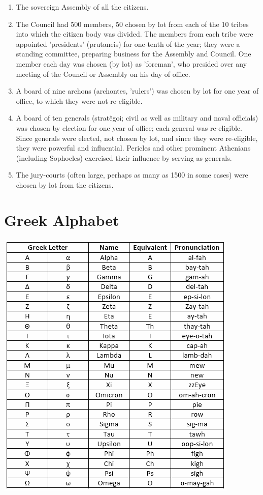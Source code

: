 \documentclass[oneside]{article}
\begin{document}
\begin{enumerate}
\item The sovereign Assembly of all the citizens. 
\item The Council had 500 members, 50 chosen by lot from each of the 10 tribes into which the citizen body was divided. The members from each tribe were appointed 'presidents' (prutaneis) for one-tenth of the year; they were a standing committee, preparing business for the Assembly and Council. One member each day was chosen (by lot) as 'foreman', who presided over any meeting of the Council or Assembly on his day of office.  
\item A board of nine archons (archontes, 'rulers') was chosen by lot for one year of office, to which they were not re-eligible. 
\item A board of ten generals (stratêgoi;  civil as well as military and naval officials) was  chosen by election for one year of office; each general was re-eligible. Since generals were elected, not chosen by lot, and since they were re-eligible, they were powerful and influential. Pericles and other prominent Athenians (including Sophocles) exercised their influence by serving as generals. 
\item  The jury-courts (often large, perhaps as many as 1500 in some cases) were chosen  by lot from the citizens. 
\end{enumerate}
 



\section*{Greek Alphabet}

\includegraphics{apha.png}
\end{document}
